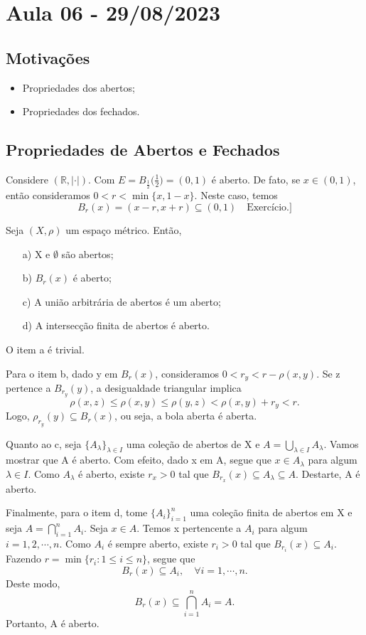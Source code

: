 \documentclass[metric_notes.tex]{subfiles}
\begin{document}
\section{Aula 06 - 29/08/2023}
\subsection{Motivações}
\begin{itemize}
	\item Propriedades dos abertos;
	\item Propriedades dos fechados.
\end{itemize}
\subsection{Propriedades de Abertos e Fechados}
\begin{example}
	Considere \((\mathbb{R}, |\cdot |)\). Com \(E = B_{\frac{1}{2}}\biggl(\frac{1}{2}\biggr) = (0, 1)\) é aberto. De fato, se \(x\in(0, 1)\),
	então consideramos \(0 < r < \min\{x, 1-x\}.\) Neste caso, temos
	\[
		B_{r}(x) = (x-r, x+r)\subseteq{(0, 1)}\quad \text{Exercício.]}
	\]
\end{example}
\begin{prop*}
	Seja \((X, \rho )\) um espaço métrico. Então,
	\begin{itemize}
		\item[a)] X e \(\emptyset\) são abertos;
		\item[b)] \(B_{r}(x)\) é aberto;
		\item[c)] A união arbitrária de abertos é um aberto;
		\item[d)] A intersecção finita de abertos é aberto.
	\end{itemize}
\end{prop*}
\begin{proof*}
	O item a é trivial.

	Para o item b, dado y em \(B_{r}(x)\), consideramos \(0 < r_{y} < r - \rho (x, y)\). Se z pertence a \(B_{r_{y}}(y)\), a desigualdade triangular implica
	\[
		\rho (x, z)\leq \rho (x, y)\leq \rho (y, z) < \rho (x, y) + r_{y} < r.
	\]
	Logo, \(\rho_{r_{y}}(y)\subseteq{B_{r}(x)}\), ou seja, a bola aberta é aberta.

	Quanto ao c, seja \(\{A_{\lambda }\}_{\lambda \in I}\) uma coleção de abertos de X e \(A = \bigcup_{\lambda \in I}^{}{A_{\lambda }}\). Vamos mostrar que A é aberto.
	Com efeito, dado x em A, segue que \(x\in A_{\lambda}\) para algum \(\lambda \in I.\) Como \(A_{\lambda }\) é aberto, existe \(r_{x} > 0\) tal que \(B_{r_{x}}(x)\subseteq{A_{\lambda}}\subseteq{A}.\)
	Destarte, A é aberto.

	Finalmente, para o item d, tome \(\{A_{i}\}_{i=1}^{n}\) uma coleção finita de abertos em X e seja \(A = \bigcap_{i=1}^{n}{A_{i}}\). Seja \(x\in A\). Temos x pertencente a \(A_{i}\) para algum \(i=1, 2, \cdots, n\).
	Como \(A_{i}\) é sempre aberto, existe \(r_{i} > 0\) tal que \(B_{r_{i}}(x)\subseteq{A_{i}}.\) Fazendo \(r=\min\{r_{i}: 1\leq i\leq n\}\), segue que
	\[
		B_{r}(x)\subseteq{A_{i}},\quad \forall i=1, \cdots, n.
	\]
	Deste modo,
	\[
		B_{r}(x)\subseteq{\bigcap_{i=1}^{n}{A_{i}}} = A.
	\]
	Portanto, A é aberto. \qedsymbol
\end{proof*}
\end{document}
